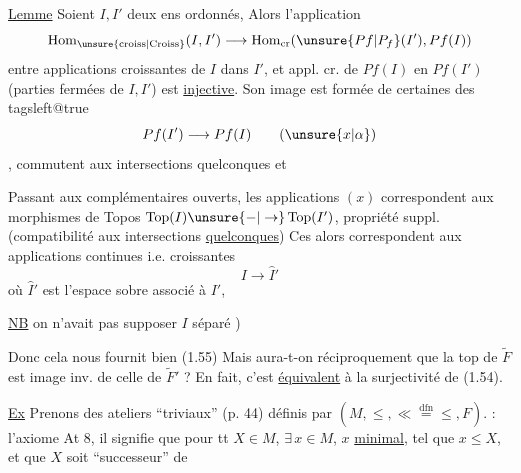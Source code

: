 
\uline{Lemme} Soient $I,I'$ deux ens  ordonnés, Alors l'application
\[
\operatorname{Hom}_{\unsure{\mathrm{croiss}|\mathrm{Croiss}}}(I,I')\longrightarrow
\operatorname{Hom}_{\mathrm{cr}}(\unsure{Pf|P_f}(I'),Pf(I))
\]
entre applications croissantes de $I$ dans $I'$, et appl. cr. de $Pf(I)$ en $Pf(I')$ (parties  fermées de $I,I'$) est \uline{injective}. Son image est formée  de certaines des
\begingroup\csname tagsleft@true\endcsname
\[
Pf(I')\longrightarrow Pf(I)\tag*{$(\unsure{x|\alpha})$}
\]
\endgroup
{}, commutent aux intersections  quelconques \unsure{,} et 

 Passant aux complémentaires ouverts,  les applications $(x)$ correspondent aux  morphismes  de Topos $\operatorname{Top}(I)\unsure{-|\to}\operatorname{Top}(I')$,   propriété suppl. (compatibilité aux intersections \uline{quelconques})  Ces  alors correspondent aux applications continues i.e. croissantes
\[
I\longrightarrow\widehat{I}'
\]
où $\widehat{I}'$ est l'espace sobre associé à $I'$, 

\uline{NB} on n'avait pas  supposer $I$ séparé )  

Donc cela nous fournit bien (1.55)   Mais aura-t-on réciproquement que la top de $\widetilde F$ est image inv. de celle de $\widetilde F'$ ? En fait, c'est \uline{équivalent} à la surjectivité de (1.54).

\uline{Ex} Prenons des ateliers ``triviaux'' (p. 44) définis par $(M,\leq,\ll\overset{\mathrm{dfn}}{=}\leq,F)$.   : l'axiome At 8, il signifie que pour tt $X\in M$, $\exists\,x\in M$, $x$ \uline{minimal}, tel que $x\leq X$,  et que  $X$ soit ``successeur'' de
